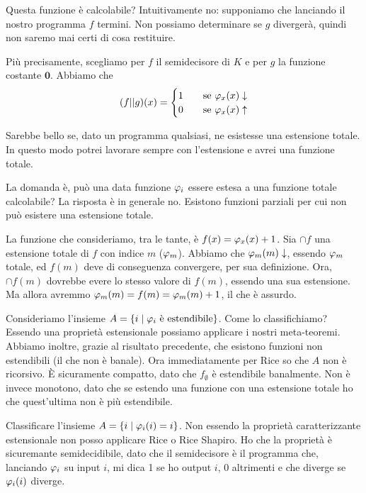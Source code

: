 Questa funzione è calcolabile? Intuitivamente no: supponiamo che lanciando il nostro programma $f$ 
termini. Non possiamo determinare se $g$ divergerà, quindi non saremo mai certi di cosa restituire.

Più precisamente, scegliamo per $f$ il semidecisore di $K$ e per $g$ la funzione costante $\bm{0}$.
Abbiamo che
\begin{equation*}
    (f || g)(x) =
    \begin{cases}
        1 \quad &\text{se $\varphi_{x}(x)\downarrow$}\\
        0 \quad &\text{se $\varphi_{x}(x)\uparrow$}\\
    \end{cases}
\end{equation*}

Sarebbe bello se, dato un programma qualsiasi, ne esistesse una estensione totale. In questo modo
potrei lavorare sempre con l'estensione e avrei una funzione totale.

La domanda è, può una data funzione $\varphi_{i}$ essere estesa a una funzione totale calcolabile? La
risposta è in generale no. Esistono funzioni parziali per cui non può esistere una estensione
totale.

La funzione che consideriamo, tra le tante, è $f(x) = \varphi_{x}(x) + 1$. Sia $\cap{f}$ una estensione
totale di $f$ con indice $m$ ($\varphi_{m}$). Abbiamo che $\varphi_{m}(m) \downarrow$, essendo $\varphi_{m}$ totale,
ed $f(m)$ deve di conseguenza convergere, per sua definizione. Ora, $\cap{f}(m)$ dovrebbe evere lo
stesso valore di $f(m)$, essendo una sua estensione. Ma allora avremmo $\varphi_{m}(m) = f(m) = \varphi_{m}(m) +
1$, il che è assurdo.

Consideriamo l'insieme $A = \{i \mid \varphi_{i} \text{ è estendibile}\}$. Come lo classifichiamo? Essendo una
proprietà estensionale possiamo applicare i nostri meta-teoremi. Abbiamo inoltre, grazie al
risultato precedente, che esistono funzioni non estendibili (il che non è banale). Ora
immediatamente per Rice so che $A$ non è ricorsivo. È sicuramente compatto, dato
che $f_{\emptyset}$ è estendibile banalmente. Non è invece monotono, dato che se estendo una
funzione con una estensione totale ho che quest'ultima non è più estendibile.

Classificare l'insieme $A = \{i \mid \varphi_{i}(i) = i\}$. Non essendo la proprietà caratterizzante
estensionale non posso applicare Rice o Rice Shapiro. Ho che la proprietà è sicuremante
semidecidibile, dato che il semidecisore è il programma che, lanciando $\varphi_{i}$ su input $i$, mi dica 1
se ho output $i$, 0 altrimenti e che diverge se $\varphi_{i}(i)$ diverge.

